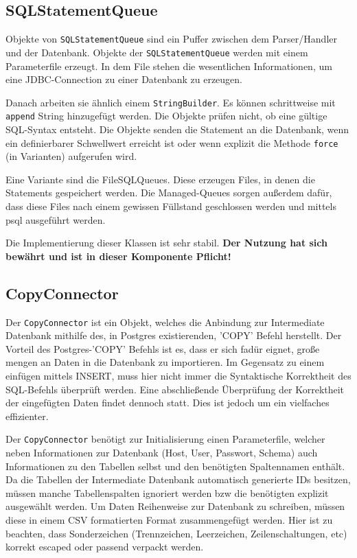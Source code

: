 \subsection{SQLStatementQueue}
\label{SQLStatementQueue}
Objekte von {\tt SQLStatementQueue} sind ein Puffer zwischen dem Parser/Handler und
der Datenbank. Objekte der {\tt SQLStatementQueue} werden mit einem Parameterfile erzeugt.
In dem File stehen die wesentlichen Informationen, um eine JDBC-Connection zu einer Datenbank
zu erzeugen.

Danach arbeiten sie ähnlich einem {\tt StringBuilder}. Es können schrittweise mit {\tt append}
String hinzugefügt werden. Die Objekte prüfen nicht, ob eine gültige SQL-Syntax entsteht.
Die Objekte senden die Statement an die Datenbank, wenn ein definierbarer Schwellwert erreicht
ist oder wenn explizit die Methode {\tt force} (in Varianten) aufgerufen wird.

Eine Variante sind die FileSQLQueues. Diese erzeugen Files, in denen die Statements gespeichert
werden. Die Managed-Queues sorgen außerdem dafür, dass diese Files nach einem gewissen Füllstand
geschlossen werden und mittels psql ausgeführt werden. 

Die Implementierung dieser Klassen ist sehr stabil. {\bf Der Nutzung hat sich bewährt und ist in
dieser Komponente Pflicht!}

\subsection{CopyConnector}
Der {\tt CopyConnector} ist ein Objekt, welches die Anbindung zur Intermediate Datenbank mithilfe des, in Postgres existierenden, 'COPY' Befehl herstellt.
Der Vorteil des Postgres-'COPY' Befehls ist es, dass er sich fadür eignet, große mengen an Daten in die Datenbank zu importieren. Im Gegensatz zu einem einfügen mittels INSERT, muss hier nicht immer die Syntaktische Korrektheit des SQL-Befehls überprüft werden. Eine abschließende Überprüfung der Korrektheit der eingefügten Daten findet dennoch statt. Dies ist jedoch um ein vielfaches effizienter. 

Der {\tt CopyConnector} benötigt zur Initialisierung einen Parameterfile, welcher neben Informationen zur Datenbank (Host, User, Passwort, Schema) auch Informationen zu den Tabellen selbst und den benötigten Spaltennamen enthält. Da die Tabellen der Intermediate Datenbank automatisch generierte IDs besitzen, müssen manche Tabellenspalten ignoriert werden bzw die benötigten explizit ausgewählt werden.
Um Daten Reihenweise zur Datenbank zu schreiben, müssen diese in einem CSV formatierten Format zusammengefügt werden. Hier ist zu beachten, dass Sonderzeichen (Trennzeichen, Leerzeichen, Zeilenschaltungen, etc) korrekt escaped oder passend verpackt werden.

